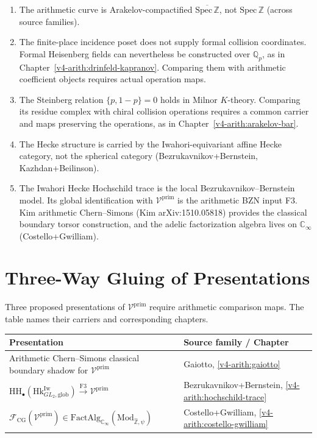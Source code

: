 \begin{enumerate}
\item The arithmetic curve is Arakelov-compactified
\(\overline{\mathrm{Spec}\,\mathbb{Z}}\), not \(\mathrm{Spec}\,\mathbb{Z}\)
(across source families).
\item The finite-place incidence poset does not supply formal
collision coordinates. Formal Heisenberg fields can nevertheless
be constructed over \(\mathbb Q_p\), as in
Chapter~\ref{v4-arith:drinfeld-kapranov}. Comparing them with
arithmetic coefficient objects requires actual operation maps.
\item The Steinberg relation \(\{p,1-p\}=0\) holds in Milnor
\(K\)-theory. Comparing its residue complex with chiral collision
operations requires a common carrier and maps preserving the
operations, as in Chapter~\ref{v4-arith:arakelov-bar}.
\item The Hecke structure is carried by the Iwahori-equivariant
affine Hecke category, not the spherical category
(Bezrukavnikov+Bernstein, Kazhdan+Beilinson).
\item The Iwahori Hecke Hochschild trace is the local
Bezrukavnikov--Bernstein model. Its global identification with
\(\mathcal{V}^{\mathrm{prim}}\) is the arithmetic BZN input F3. Kim
arithmetic Chern--Simons (Kim arXiv:1510.05818) provides the classical
boundary torsor construction, and the adelic factorization algebra
lives on \(\mathbb{C}_{\infty}\) (Costello+Gwilliam).
\end{enumerate}

\section{Three-Way Gluing of Presentations}
\label{v4-arith:app:B:three-way-gluing}

Three proposed presentations of $\mathcal{V}^{\mathrm{prim}}$ require
arithmetic comparison maps. The table names their carriers and
corresponding chapters.

\begin{center}
\begin{tabular}{l|l}
Presentation & Source family / Chapter \\
\hline
Arithmetic Chern--Simons classical boundary shadow for \(\mathcal{V}^{\mathrm{prim}}\) & Gaiotto, \ref{v4-arith:gaiotto} \\
\(\mathrm{HH}_{\bullet}(\mathrm{Hk}^{\mathrm{Iw}}_{GL_{2},\mathrm{glob}})\xrightarrow{\mathrm{F3}}\mathcal{V}^{\mathrm{prim}}\) & Bezrukavnikov+Bernstein, \ref{v4-arith:hochschild-trace} \\
\(\mathcal{F}_{\mathrm{CG}}(\mathcal{V}^{\mathrm{prim}})\in\mathrm{FactAlg}_{\mathbb{C}_{\infty}}(\mathrm{Mod}_{\widehat{\mathbb{Z}},\psi})\) & Costello+Gwilliam, \ref{v4-arith:costello-gwilliam}
\end{tabular}
\end{center}

